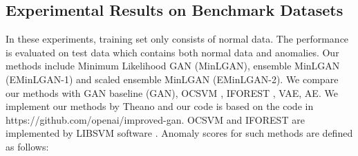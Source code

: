 \documentclass[a4paper,conference]{IEEEtran}
\begin{document}



\subsection{Experimental Results on Benchmark Datasets}
In these experiments,  training set only consists of normal data. The performance is evaluated on test data which contains both normal data and anomalies.  Our methods include Minimum Likelihood GAN (MinLGAN), ensemble MinLGAN (EMinLGAN-1) and scaled  ensemble MinLGAN (EMinLGAN-2). We compare our  methods with GAN baseline (GAN), OCSVM \cite{scholkopf2001}, IFOREST \cite{liu2008isolation}, VAE, AE. We implement our methods by Theano and our code is based on the code in https://github.com/openai/improved-gan. OCSVM  and  IFOREST are implemented by LIBSVM software \cite{chang2011libsvm}. Anomaly scores for such methods are defined as follows:
\end{document}

